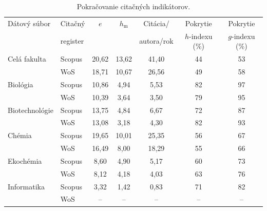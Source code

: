 \begin{table}
\centering\small
\begin{tabular}{llccccc}
  \hline\noalign{\vspace{.3ex}}
  Dátový súbor & Citačný  & $e$ & $h_{\mathrm{m}}$ & Citácia/   & Pokrytie        & Pokrytie        \\
               & register &     &                  & autora/rok & $h$-indexu (\%) & $g$-indexu (\%) \\[0.3ex]
  \hline\noalign{\vspace{.5ex}}
  Celá fakulta   & Scopus & 20,62 & 13,62 & 41,40 & 44 & 53 \\
                 & WoS    & 18,71 & 10,67 & 26,56 & 49 & 58 \\[1ex]
  Biológia       & Scopus & 10,86 &  4,94 &  5,53 & 82 & 97 \\
                 & WoS    & 10,39 &  3,64 &  3,50 & 79 & 95 \\[1ex]
  Biotechnológie & Scopus & 13,75 &  4,84 &  6,67 & 72 & 87 \\
                 & WoS    & 13,08 &  3,18 &  4,30 & 82 & 93 \\[1ex]
  Chémia         & Scopus & 19,65 & 10,01 & 25,35 & 56 & 67 \\
                 & WoS    & 16,49 &  8,00 & 18,29 & 55 & 66 \\[1ex]
  Ekochémia      & Scopus &  8,60 &  4,90 &  5,17 & 60 & 73 \\
                 & WoS    &  8,12 &  4,18 &  4,03 & 63 & 76 \\[1ex]
  Informatika    & Scopus &  3,32 &  1,42 &  0,83 & 71 & 82 \\
                 & WoS    & --    & --    & --    & -- & -- \\[0.5ex]
  \hline
\end{tabular}
\caption{Pokračovanie citačných indikátorov.}
\label{tab:citation.indicators2}
\end{table}


